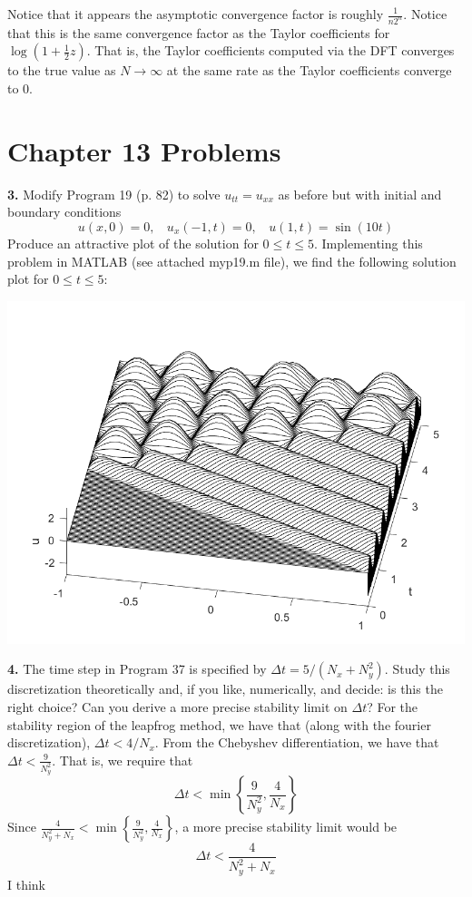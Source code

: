 \documentclass{article}
\begin{document}
Notice that it appears the asymptotic convergence factor is roughly $\frac{1}{n2^n}$. Notice that this is the same convergence factor as the Taylor coefficients for $\log(1 + \frac{1}{2}z)$. That is, the Taylor coefficients computed via the DFT converges to the true value as $N \to \infty$ at the same rate as the Taylor coefficients converge to 0.


\section*{Chapter 13 Problems}
\textbf{3.} Modify Program 19 (p. 82) to solve $u_{tt} = u_{xx}$ as before but with initial and boundary conditions
\[u(x,0) = 0, \:\:\:\: u_x(-1,t) = 0, \:\:\:\: u(1,t) = \sin(10t)\]
Produce an attractive plot of the solution for $0 \leq t  \leq 5$.
\newline\newline\newline
Implementing this problem in MATLAB (see attached myp19.m file), we find the following solution plot for $0 \leq t \leq 5$:
\begin{center}
    \includegraphics[scale = 0.6]{p19Plot}
\end{center}


\textbf{4.} The time step in Program 37 is specified by $\Delta t = 5/(N_x + N_y^2)$. Study this discretization theoretically and, if you like, numerically, and decide: is this the right choice? Can you derive a more precise stability limit on $\Delta t$?
\newline\newline\newline
For the stability region of the leapfrog method, we have that (along with the fourier discretization), $\Delta t < 4/N_x$. From the Chebyshev differentiation, we have that $\Delta t < \frac{9}{N_y^2}$. That is, we require that 
\[\Delta t < \min\left\{\frac{9}{N_y^2}, \frac{4}{N_x}\right\}\]
Since $\frac{4}{N_y^2 + N_x} < \min\left\{\frac{9}{N_y^2}, \frac{4}{N_x}\right\}$, a more precise stability limit would be 
\[\Delta t < \frac{4}{N_y^2 + N_x}\]
I think
\end{document}
